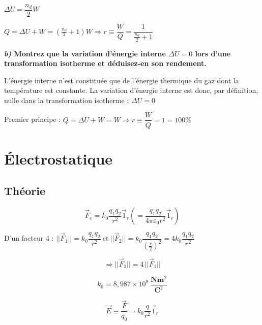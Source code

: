 \documentclass	[11pt, a4paper, openany]{book}
\begin{document}
		$ \Delta U = \dfrac{n_d}{2}W$
				
		$Q = \Delta U + W = (\frac{n_d}{2}+1)W \Rightarrow r \equiv \dfrac{W}{Q} = \dfrac{1}{\frac{n_d}{2}+1}$
				
		\textbf{\textit{b)} Montrez que la variation d'énergie interne $\Delta U = 0$ lors d'une transformation isotherme et déduisez-en son rendement.}
				
		L'énergie interne n'est constituée que de l'énergie thermique du gaz dont la température est constante. La variation d'énergie interne est donc, par définition, nulle dans la transformation isotherme : $\Delta U = 0$
				
		Premier principe : $Q = \Delta U + W = W \Rightarrow r \equiv \dfrac{W}{Q} = 1 = 100\% $
				
		
		\newpage
		\section{Électrostatique}
		\subsection{Théorie}
			
		$$ \vec F_e = k_0 \dfrac{q_1 q_2}{r^2} \vec 1_r \left(= \dfrac{q_1 q_2}{4\pi \varepsilon_0 r^2} \vec 1_r \right) $$
			
			
		D'un facteur 4 : $ ||\vec F_1|| = k_0 \dfrac{q_1 q_2}{r^2}\ \text{et}\ ||\vec F_2|| = k_0 \dfrac{q_1 q_2}{(\frac{r}{2})^2} = 4 k_0 \dfrac{q_1 q_2}{r^2}$
			
		$$\Rightarrow ||\vec F_2|| = 4\,||\vec F_1||$$
			
			
		$$ k_0 = 8,987 \times 10^9\ \frac{\textbf{N} \textbf{m}^2}{\textbf{C}^2} $$
			
			
		$$ \vec E \equiv \dfrac{\vec F}{q_0} = k_0 \dfrac{q}{r^2} \vec 1_r $$
			
\end{document}
